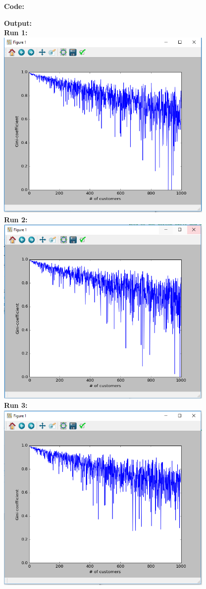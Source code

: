 \documentclass{WeSTassignment}
\begin{document}
\textbf{Code:}

\textbf{Output:}\\
\textbf{Run 1:}\\
\includegraphics[width=400px]{1stPlot}\\
\textbf{Run 2:}\\
\includegraphics[width=400px]{2ndPlot}\\
\textbf{Run 3:}\\
\includegraphics[width=400px]{3rdPlot}\\
\end{document}
